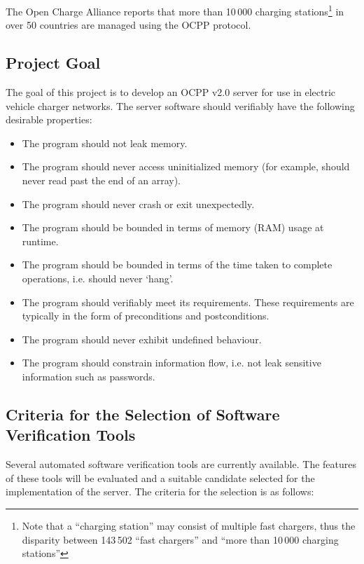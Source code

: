 \documentclass[11pt]{article}
\begin{document}
The Open Charge Alliance \cite{OCAappraisal} reports that more than 10\,000 charging stations\footnote{Note that a ``charging station'' may consist of multiple fast chargers, thus the disparity between 143\,502 ``fast chargers'' and ``more than 10\,000 charging stations''} in over 50 countries are managed using the OCPP protocol.



\subsection{Project Goal}
The goal of this project is to develop an OCPP v2.0 server for use in electric vehicle charger networks. The server software should verifiably have the following desirable properties: 

\begin{itemize}
	\item The program should not leak memory.
	\item The program should never access uninitialized memory (for example, should never read past the end of an array).
	\item The program should never crash or exit unexpectedly.
	\item The program should be bounded in terms of memory (RAM) usage at runtime.
 	\item The program should be bounded in terms of the time taken to complete operations, i.e. should never `hang'.
	\item The program should verifiably meet its requirements. These requirements are typically in the form of preconditions and postconditions.
	\item The program should never exhibit undefined behaviour.
	\item The program should constrain information flow, i.e. not leak sensitive information such as passwords.
\end{itemize}


\subsection{Criteria for the Selection of Software Verification Tools}
Several automated software verification tools are currently available. The features of these tools will be evaluated and a suitable candidate selected for the implementation of the server. The criteria for the selection is as follows:
\end{document}
